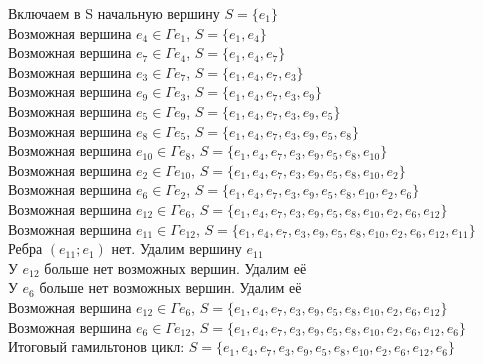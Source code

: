 Включаем в S начальную вершину $S=\{e_1\}$\\
\textquotedbl Возможная\textquotedbl{} вершина $e_{4}\in\Gamma e_{1}$, $S=\{e_{1},e_{4}\}$\\
\textquotedbl Возможная\textquotedbl{} вершина $e_{7}\in\Gamma e_{4}$, $S=\{e_{1},e_{4},e_{7}\}$\\
\textquotedbl Возможная\textquotedbl{} вершина $e_{3}\in\Gamma e_{7}$, $S=\{e_{1},e_{4},e_{7},e_{3}\}$\\
\textquotedbl Возможная\textquotedbl{} вершина $e_{9}\in\Gamma e_{3}$, $S=\{e_{1},e_{4},e_{7},e_{3},e_{9}\}$\\
\textquotedbl Возможная\textquotedbl{} вершина $e_{5}\in\Gamma e_{9}$, $S=\{e_{1},e_{4},e_{7},e_{3},e_{9},e_{5}\}$\\
\textquotedbl Возможная\textquotedbl{} вершина $e_{8}\in\Gamma e_{5}$, $S=\{e_{1},e_{4},e_{7},e_{3},e_{9},e_{5},e_{8}\}$\\
\textquotedbl Возможная\textquotedbl{} вершина $e_{10}\in\Gamma e_{8}$, $S=\{e_{1},e_{4},e_{7},e_{3},e_{9},e_{5},e_{8},e_{10}\}$\\
\textquotedbl Возможная\textquotedbl{} вершина $e_{2}\in\Gamma e_{10}$, $S=\{e_{1},e_{4},e_{7},e_{3},e_{9},e_{5},e_{8},e_{10},e_{2}\}$\\
\textquotedbl Возможная\textquotedbl{} вершина $e_{6}\in\Gamma e_{2}$, $S=\{e_{1},e_{4},e_{7},e_{3},e_{9},e_{5},e_{8},e_{10},e_{2},e_{6}\}$\\
\textquotedbl Возможная\textquotedbl{} вершина $e_{12}\in\Gamma e_{6}$, $S=\{e_{1},e_{4},e_{7},e_{3},e_{9},e_{5},e_{8},e_{10},e_{2},e_{6},e_{12}\}$\\
\textquotedbl Возможная\textquotedbl{} вершина $e_{11}\in\Gamma e_{12}$, $S=\{e_{1},e_{4},e_{7},e_{3},e_{9},e_{5},e_{8},e_{10},e_{2},e_{6},e_{12},e_{11}\}$\\
Ребра $(e_{11};e_{1})$ нет. Удалим вершину $e_{11}$\\
У $e_{12}$ больше нет \textquotedbl возможных\textquotedbl{} вершин. Удалим её\\
У $e_{6}$ больше нет \textquotedbl возможных\textquotedbl{} вершин. Удалим её\\
\textquotedbl Возможная\textquotedbl{} вершина $e_{12}\in\Gamma e_{6}$, $S=\{e_{1},e_{4},e_{7},e_{3},e_{9},e_{5},e_{8},e_{10},e_{2},e_{6},e_{12}\}$\\
\textquotedbl Возможная\textquotedbl{} вершина $e_{6}\in\Gamma e_{12}$, $S=\{e_{1},e_{4},e_{7},e_{3},e_{9},e_{5},e_{8},e_{10},e_{2},e_{6},e_{12},e_{6}\}$\\
Итоговый гамильтонов цикл: $S=\{
e_{1},e_{4},e_{7},e_{3},e_{9},e_{5},e_{8},e_{10},e_{2},e_{6},e_{12},e_{6}\}$\\

